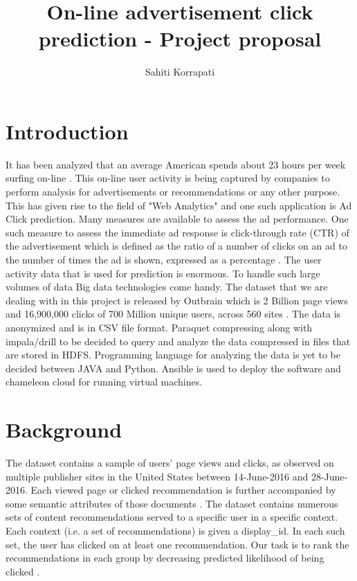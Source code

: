 \documentclass[9pt,twocolumn,twoside]{styles/osajnl}
\title{ On-line advertisement click prediction - Project proposal }
\author[1,*]{Sahiti Korrapati}
\affil[1]{School of Informatics and Computing, Bloomington, IN 47408, U.S.A.}
\affil[*]{Corresponding authors: sakorrap@iu.edu, S17-IR-2013}
\begin{document}
\maketitle

\section{Introduction}
It has been analyzed that an average American spends about 23 hours per week surfing on-line \cite{news-social-media}. This on-line user activity is being captured by companies to perform analysis for advertisements or recommendations or any other purpose. This has given rise to the field of "Web Analytics" and one such application is Ad Click prediction.
Many measures are available to assess the ad performance. One such measure to assess the immediate ad response is click-through rate (CTR) of the advertisement \cite{dictionary-clickThrough} which is defined as the ratio of a number of clicks on an ad to the number of times the ad is shown, expressed as a percentage \cite{wiki-clickThrough}.
The user activity data that is used for prediction is enormous. To handle such large volumes of data Big data technologies come handy. The dataset that we are dealing with in this project is released by Outbrain which is 2 Billion page views and 16,900,000 clicks of 700 Million unique users, across 560 sites \cite{kaggle-outbrain}. The data is anonymized and is in CSV file format. Paraquet compressing along with impala/drill to be decided to query and analyze the data compressed in files that are stored in HDFS. Programming language for analyzing the data is yet to be decided between JAVA and Python. Ansible is used to deploy the software and chameleon cloud for running virtual machines.

\section{Background}
The dataset contains a sample of users’ page views and clicks, as observed on multiple publisher sites in the United States between 14-June-2016 and 28-June-2016. Each viewed page or clicked recommendation is further accompanied by some semantic attributes of those documents \cite{kaggle-outbrain}.
The dataset contains numerous sets of content recommendations served to a specific user in a specific context. Each context (i.e. a set of recommendations) is given a display\_id. In each such set, the user has clicked on at least one recommendation. Our task is to rank the recommendations in each group by decreasing predicted likelihood of being clicked \cite{kaggle-outbrain}.
\end{document}

